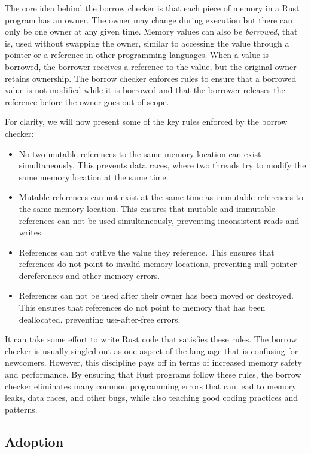 The core idea behind the borrow checker is that each piece of memory in a Rust program has an owner.
The owner may change during execution but there can only be one owner at any given time.
Memory values can also be \emph{borrowed}, that is, used without swapping the owner,
similar to accessing the value through a pointer or a reference in other programming languages.
When a value is borrowed, the borrower receives a reference to the value, but the original owner retains ownership.
The borrow checker enforces rules to ensure that a borrowed value is not modified while it is borrowed
and that the borrower releases the reference before the owner goes out of scope.

For clarity, we will now present some of the key rules enforced by the borrow checker:

\begin{itemize}
    \item No two mutable references to the same memory location can exist simultaneously.
          This prevents data races, where two threads try to modify the same memory location at the same time.
    \item Mutable references can not exist at the same time as immutable references to the same memory location.
          This ensures that mutable and immutable references can not be used simultaneously,
          preventing inconsistent reads and writes.
    \item References can not outlive the value they reference.
          This ensures that references do not point to invalid memory locations,
          preventing null pointer dereferences and other memory errors.
    \item References can not be used after their owner has been moved or destroyed.
          This ensures that references do not point to memory that has been deallocated,
          preventing use-after-free errors.
\end{itemize}

It can take some effort to write Rust code that satisfies these rules.
The borrow checker is usually singled out as one aspect of the language that is confusing for newcomers.
However, this discipline pays off in terms of increased memory safety and performance.
By ensuring that Rust programs follow these rules, the borrow checker eliminates many common programming errors
that can lead to memory leaks, data races, and other bugs, while also teaching good coding practices and patterns.

\subsection{Adoption}

